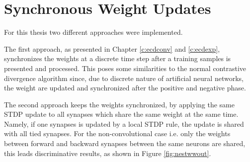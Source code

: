 \section{Synchronous Weight Updates} \label{fig:ecdnestconv}

For this thesis two different approaches were implemented. 

The first approach, as presented in Chapter \ref{c:ecdconv} and \ref{c:ecdexp}, synchronizes the weights at a discrete time step after a training samples is presented and processed.
This poses some similarities to the normal contrastive divergence algorithm since, due to discrete nature of artificial neural networks, the weight are updated and synchronized after the positive and negative phase.  

The second approach keeps the weights synchronized, by applying the same STDP update to all synapses which share the same weight at the same time. 
Namely, if one synapses is updated by a local STDP rule, the update is shared with all tied synapses.
For the non-convolutional case i.e. only the weights between forward and backward synapses between the same neurons are shared, this leads discriminative results, as shown in Figure \ref{fig:nestwwout}.

